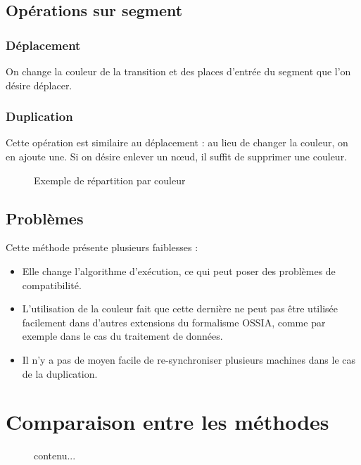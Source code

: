\subsection{Opérations sur segment}
\subsubsection{Déplacement}
On change la couleur de la transition et des places d'entrée du segment que l'on désire déplacer.

\subsubsection{Duplication}
Cette opération est similaire au déplacement : au lieu de changer la couleur, on en ajoute une. Si on désire enlever un nœud, il suffit de supprimer une couleur.

\begin{figure}[h]
\centering

\caption{Exemple de répartition par couleur} 
\end{figure}

\subsection{Problèmes}
Cette méthode présente plusieurs faiblesses : 
\begin{itemize}
	\item Elle change l'algorithme d'exécution, ce qui peut poser des problèmes de compatibilité.
	\item L'utilisation de la couleur fait que cette dernière ne peut pas être utilisée facilement dans d'autres extensions du formalisme \ac{OSSIA}, comme par exemple dans le cas du traitement de données\cite{arias2014modelling}.
	\item Il n'y a pas de moyen facile de re-synchroniser plusieurs machines dans le cas de la duplication.
\end{itemize}
\section{Comparaison entre les méthodes}

\begin{figure}
	\begin{tabular}
		contenu...
	\end{tabular}
\end{figure}